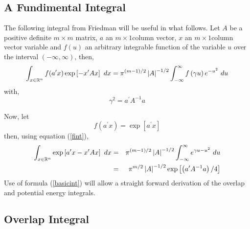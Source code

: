 \documentclass[12pt,thmsa]{article}
\begin{document}
\subsection{A Fundimental Integral}

The following integral from Friedman\cite{Friedman90int} will be useful in
what follows. Let $A$ be a positive definite $m\times m$ matrix, $a$ an $%
m\times 1$column vector, $x$ an $m\times 1$column vector variable and $%
f\left( u\right) $ an arbitrary integrable function of the variable $u$ over
the interval $\left( -\infty ,\infty \right) $, then, 
\begin{equation}
\int_{x\in \Bbb{R}^n}f(a^{\prime }x)\exp \left[ -x^{\prime }Ax\right]
\,\,dx=\pi ^{\left( m-1\right) /2}\left| A\right| ^{-1/2}\int_{-\infty
}^\infty f\left( \gamma u\right) e^{-u^2}\,\,du  \label{fint}
\end{equation}
with, 
\[
\gamma ^2=a^{\prime }A^{-1}a 
\]

Now, let 
\[
f\left( a^{\prime }x\right) =\exp \left[ a^{\prime }x\right] 
\]
then, using equation (\ref{fint}), 
\begin{eqnarray}
\int_{x\in \Bbb{R}^n}\exp \left[ a^{\prime }x-x^{\prime }Ax\right] \,\,dx
&=&\pi ^{\left( m-1\right) /2}\left| A\right| ^{-1/2}\int_{-\infty }^\infty
e^{\gamma u-u^2}\,\,du  \nonumber \\
&=&\pi ^{m/2}\left| A\right| ^{-1/2}\exp \left[ \left( a^{\prime
}A^{-1}a\right) /4\right]  \label{basicint}
\end{eqnarray}
Use of formula (\ref{basicint}) will allow a straight forward derivation of
the overlap and potential energy integrals.

\subsection{Overlap Integral}
\end{document}
